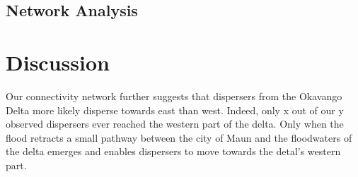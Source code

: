 \documentclass[abstract=on,10pt,a4paper,bibliography=totocnumbered]{article}
\begin{document}

\subsection{Network Analysis}


\section{Discussion}
Our connectivity network further suggests that dispersers from the Okavango
Delta more likely disperse towards east than west. Indeed, only x out of our y
observed dispersers ever reached the western part of the delta. Only when the
flood retracts a small pathway between the city of Maun and the floodwaters of
the delta emerges and enables dispersers to move towards the detal's western
part.
\end{document}
